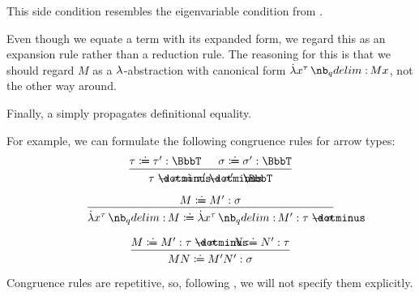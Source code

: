 \begin{remark}
\begin{thmenum}
\begin{thmenum}
      This side condition resembles the eigenvariable condition from .

      Even though we equate a term with its expanded form, we regard this as an expansion rule rather than a reduction rule. The reasoning for this is that we should regard \( M \) as a \( {\mathrm \lambda} \)-abstraction with canonical form \( \qabs {x^\tau} M x \), not the other way around.

       Finally, a  simply propagates definitional equality.

      For example, we can formulate the following congruence rules for arrow types:
      \begin{equation*}
        \begin{prooftree}
          \hypo{ \tau \syndefeq \tau': \BbbT }
          \hypo{ \sigma \syndefeq \sigma': \BbbT }
          \infer2{ \tau \synimplies \sigma \syndefeq \tau' \synimplies \sigma': \BbbT }
        \end{prooftree}
      \end{equation*}

      \begin{paracol}{2}
        \begin{leftcolumn}
          \ParacolAlignmentHack
          \begin{equation*}
            \begin{prooftree}
              \hypo{ M \syndefeq M': \sigma }
              \infer1{ \qabs {x^{\tau}} M \syndefeq \qabs {x^{\tau}} M': \tau \synimplies \sigma }
            \end{prooftree}
          \end{equation*}
        \end{leftcolumn}

        \begin{rightcolumn}
          \ParacolAlignmentHack
          \begin{equation*}
            \begin{prooftree}
              \hypo{ M \syndefeq M': \tau \synimplies \sigma }
              \hypo{ N \syndefeq N': \tau }
              \infer2{ M N \syndefeq M' N': \sigma }
            \end{prooftree}
          \end{equation*}
        \end{rightcolumn}
      \end{paracol}
      \columnratio{}

      Congruence rules are repetitive, so, following \cite[\S A.2]{UnivalentFoundationsProgram2024OctoberHoTT}, we will not specify them explicitly.
    \end{thmenum}
  \end{thmenum}
\end{remark}
